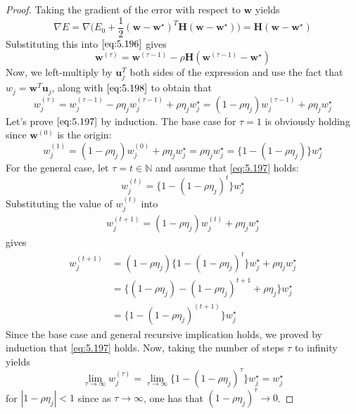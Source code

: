 \vspace{1em}

\begin{proof}
    Taking the gradient of the error with respect to $\mathbf{w}$ yields
    \[
        \nabla E = \nabla\bigg(E_0 
            + \frac{1}{2}(\mathbf{w} - \mathbf{w}^\star)^T\mathbf{H} (\mathbf{w} - \mathbf{w}^\star)\bigg)
        = \mathbf{H}(\mathbf{w} - \mathbf{w}^\star)
    \] 
    Substituting this into $\eqref{eq:5.196}$ gives
    \[
        \mathbf{w}^{(\tau)} 
        = \mathbf{w}^{(\tau - 1)} - \rho \mathbf{H} (\mathbf{w}^{(\tau - 1)} - \mathbf{w}^\star)
    \] 
    Now, we left-multiply by $\mathbf{u}_j^T$ both sides of the expression and use the
    fact that $w_j = \mathbf{w}^T\mathbf{u}_j$, along with $\eqref{eq:5.198}$ to obtain that
    \[
        w_j^{(\tau)} = w_j^{(\tau - 1)} - \rho \eta_j w^{(\tau - 1)}_j + \rho \eta_j w_j^\star
        = (1 - \rho \eta_j) w_j^{(\tau - 1)} + \rho \eta_j w_j^\star
    \] 
    Let's prove $\eqref{eq:5.197}$ by induction. The base case for $\tau = 1$ is obviously holding since
    $\mathbf{w}^{(0)}$ is the origin:
    \[
        w_j^{(1)} 
        = (1 - \rho \eta_j) w_j^{(0)} + \rho \eta_j w_j^\star
        = \rho \eta_j w_j^\star
        = \{1 - (1 - \rho \eta_j)\} w_j^\star
    \] 
    For the general case, let $\tau = t \in \mathbb{N}$ and assume that
    \eqref{eq:5.197} holds:
    \[
        w_j^{(t)} = \{1 - (1 - \rho \eta_j)^t\} w_j^\star
    \] 
    Substituting the value of $w_j^{(t)}$ into
    \begin{align*}
        w_j^{(t + 1)} = (1 - \rho \eta_j)w_j^{(t)} + \rho \eta_j w_j^\star
    \end{align*}
    gives
    \begin{align*}
        w_j^{(t + 1)} 
        &= (1 - \rho \eta_j) \{1 - (1 - \rho \eta_j)^t\} 
            w_j^\star + \rho \eta_j w_j^\star \\
        &= \big\{(1 - \rho \eta_j) - (1 - \rho \eta_j)^{t + 1} + \rho \eta_j\big\} w_j^\star \\
        &= \{1 - (1 - \rho \eta_j)^{(t + 1)}\} w_j^\star
    \end{align*}
    Since the base case and general recursive implication holds, we proved by induction that 
    \eqref{eq:5.197} holds. Now, taking the number of steps $\tau$ to infinity yields
    \[
        \lim_{\tau \to \infty} w_j^{(\tau)}
        = \lim_{\tau \to \infty} \{1 - (1 - \rho \eta_j)^\tau\} w_j^\star
        = w_j^\star
    \] 
    for $|1 - \rho \eta_j| < 1$ since as $\tau \to \infty$, one has that $(1 - \rho \eta_j)^\tau \to 0$.

\end{proof}
